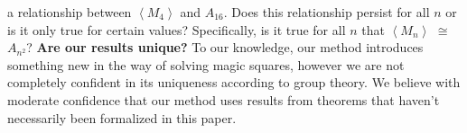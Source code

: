 \documentclass[12pt]{report}
\begin{document}
a relationship between $\left\langle M_4 \right\rangle$ and $A_{16}$. Does this relationship
persist for all $n$ or is it only true for certain values? Specifically, is it true for all $n$
that $\left\langle M_n \right\rangle$ $\cong$ $A_{n^2}$?
\linebreak
\linebreak
\textbf{Are our results unique?} To our knowledge, our method introduces something new in the way
of solving magic squares, however we are not completely confident in its uniqueness according to
group theory. We believe with moderate confidence that our method uses results from theorems that
haven't necessarily been formalized in this paper.

\nocite{*}
\printbibliography{}
\end{document}
